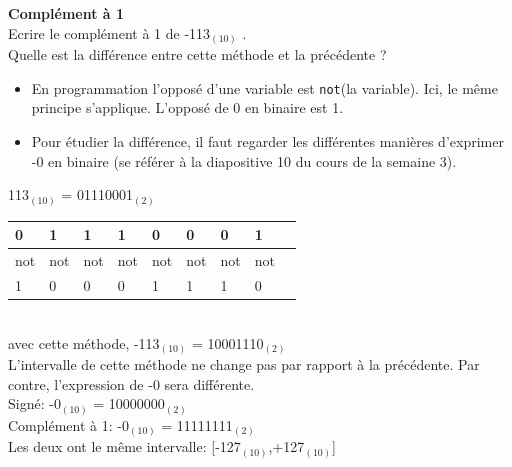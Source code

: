 \begin{Exercice}[5 minutes] \textbf{Complément à 1}\\
    Ecrire le complément à 1 de -113$_{(10)}$ . \\

	Quelle est la différence entre cette méthode et la précédente ? \\

    \begin{conseil}
        \begin{itemize}
        	\item En programmation l'opposé d'une variable est \lstinline{not}(la variable). Ici, le même principe s'applique. L'opposé de 0 en binaire est 1.
        	\item Pour étudier la différence, il faut regarder les différentes manières d'exprimer -0 en binaire (se référer à la diapositive 10 du cours de la semaine 3).
        \end{itemize} 
    \end{conseil}
    
    \begin{solution}
    	113$_{(10)}$ = 01110001$_{(2)}$ \\
    	
        \begin{tabular}{| p{1cm} | p{1cm} | p{1cm} | p{1cm} | p{1cm} | p{1cm} | p{1cm} | p{1cm} | p{1cm} |} 
            \hline
            0 & 1 & 1 & 1 & 0 & 0 & 0 & 1 \\ [0.5ex] 
            \hline
            not & not & not & not & not & not & not & not \\ [0.5ex]
            \hline
            1 & 0 & 0 & 0 & 1 & 1 & 1 & 0 \\ [0.5ex]
            \hline
        \end{tabular} \\
        
        avec cette méthode, -113$_{(10)}$ = 10001110$_{(2)}$ \\
        
        L'intervalle de cette méthode ne change pas par rapport à la précédente. Par contre, l'expression de -0 sera différente.\\
        
        Signé: -0$_{(10)}$ = 10000000$_{(2)}$ \\
        
        Complément à 1: -0$_{(10)}$ = 11111111$_{(2)}$ \\
        
        Les deux ont le même intervalle: [-127$_{(10)}$,+127$_{(10)}$] \\
        
    \end{solution}
\end{Exercice}


